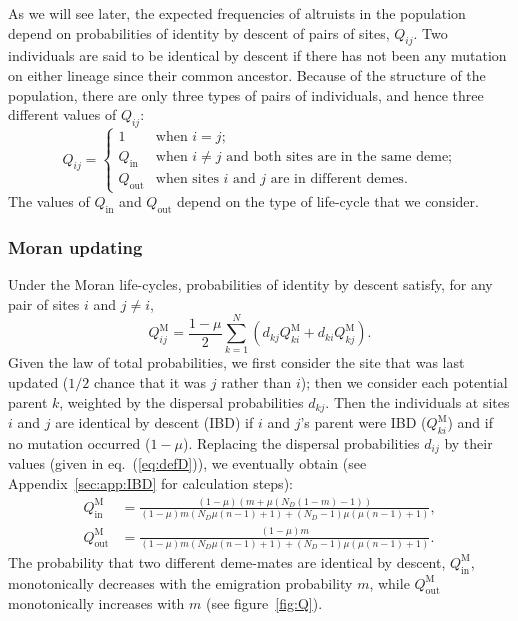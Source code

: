 \documentclass[11pt, letterpaper]{article}
\renewcommand{\eqref}[1]{\textup{{\normalfont eq.~(\ref{#1}}\normalfont)}}
\newcommand{\appname}[0]{Appendix}
\newcommand{\Moran}{\textrm{M}}
\newcommand{\Qin}{Q_{\textrm{in}}}
\newcommand{\Qout}{Q_{\textrm{out}}}
\newcommand{\ndemes}{N_D}
\begin{document}
As we will see later, the expected frequencies of altruists in the population depend on probabilities of identity by descent of pairs of sites, $Q_{ij}$. Two individuals are said to be identical by descent if there has not been any mutation on either lineage since their common ancestor.  Because of the structure of the population, there are only three types of pairs of individuals, and hence three different values of $Q_{ij}$:
\begin{equation}
Q_{ij} = 
\begin{cases}
1 & \textrm{when $i=j$;}\\
%
\Qin & \textrm{when $i\neq j$ and both sites are in the same deme;}\\
%
\Qout & \textrm{when sites $i$ and $j$ are in different demes.}
\end{cases}
\end{equation}
The values of $\Qin$ and $\Qout$ depend on the type of life-cycle that we consider. 

\subsubsection{Moran updating} 

Under the Moran life-cycles, probabilities of identity by descent satisfy, for any pair of sites $i$ and $j\neq i$,
\begin{equation}
Q_{ij}^{\Moran} = \frac{1-\mu}{2} \sum_{k=1}^N \left(d_{kj} Q_{ki}^{\Moran} + d_{ki} Q_{kj}^{\Moran}\right).
\end{equation}
%
Given the law of total probabilities, we first consider the site that was last updated ($1/2$ chance that it was $j$ rather than $i$); then we consider each potential parent $k$, weighted by the dispersal probabilities $d_{kj}$. Then the individuals at sites $i$ and $j$ are identical by descent (IBD) if $i$ and $j$'s parent were IBD ($Q_{ki}^{\Moran}$) and if no mutation occurred ($1-\mu$).  Replacing the dispersal probabilities $d_{ij}$ by their values (given in \eqref{eq:defD}), we eventually obtain (see \appname~\ref{sec:app:IBD} for calculation steps):
\begin{subequations}\label{eq:QM}
\begin{align}
\Qin^{\Moran} &= \frac{(1-\mu ) \left(m + \mu  (\ndemes (1-m)-1)\right)}{(1-\mu ) m (\ndemes \mu  (n-1)+1)+(\ndemes-1) \mu  (\mu  (n-1)+1)},\\
%
%
\Qout^{\Moran} & = \frac{(1-\mu ) m}{(1-\mu ) m (\ndemes \mu  (n-1)+1)+(\ndemes-1) \mu  (\mu  (n-1)+1)}.
\end{align}
\end{subequations}
%
The probability that two different deme-mates are identical by descent, $\Qin^{\Moran}$, monotonically decreases with the emigration probability $m$, while  $\Qout^{\Moran}$ monotonically increases with $m$ (see figure~\ref{fig:Q}). 
\end{document}
